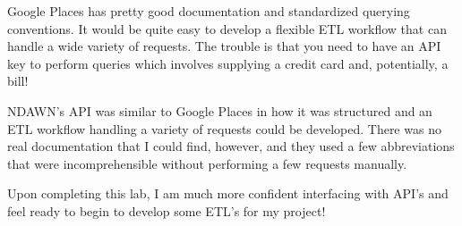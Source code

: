 \documentclass[article,12pt]{article}
\numberwithin{equation}{section}
\begin{document}
Google Places has pretty good documentation and standardized querying conventions. It would be quite easy to develop a flexible ETL workflow that can handle a wide variety of requests. The trouble is that you need to have an API key to perform queries which involves supplying a credit card and, potentially, a bill!

NDAWN's API was similar to Google Places in how it was structured and an ETL workflow  handling a variety of requests could be developed. There was no real documentation that I could find, however, and they used a few abbreviations that were incomprehensible without performing a few requests manually.

Upon completing this lab, I am much more confident interfacing with API's and feel ready to begin to develop some ETL's for my project!  

\end{document}
